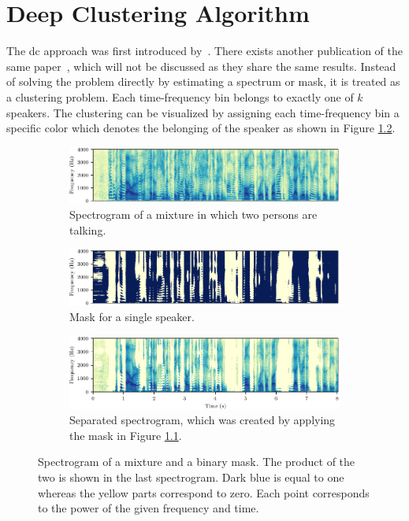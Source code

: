 \chapter{Deep Clustering Algorithm}\label{chapter.dc}

The \acrlong{dc} approach was first introduced by~\textcite{Hershey2016}. There exists another publication of the same paper~\cite{Hershey2015}, which will not be discussed as they share the same results. Instead of solving the problem directly by estimating a spectrum or mask, it is treated as a clustering problem. Each time-frequency bin belongs to exactly one of $k$ speakers. The clustering can be visualized by assigning each time-frequency bin a specific color which denotes the belonging of the speaker as shown in Figure \ref{fig.masking-demonstration}.

\begin{figure}[ht]
	\centering
	\begin{subfigure}[t]{\textwidth}
		\centering
		\includegraphics{figure/masking_demonstration-1.pdf}
		\caption{Spectrogram of a mixture in which two persons are talking.}
	\end{subfigure}

	\begin{subfigure}[t]{\textwidth}
		\centering
		\includegraphics{figure/masking_demonstration-2.pdf}
		\caption{Mask for a single speaker.}
		\label{fig.masking-demonstration.mask}
	\end{subfigure}

	\begin{subfigure}[t]{\textwidth}
		\centering
		\includegraphics{figure/masking_demonstration-3.pdf}
		\caption{Separated spectrogram, which was created by applying the mask in Figure \ref{fig.masking-demonstration.mask}.}
	\end{subfigure}%
	\caption{Spectrogram of a mixture and a binary mask. The product of the two is shown in the last spectrogram. Dark blue is equal to one whereas the yellow parts correspond to zero.
	Each point corresponds to the power of the given frequency and time. 
	}
	\label{fig.masking-demonstration}
\end{figure}


